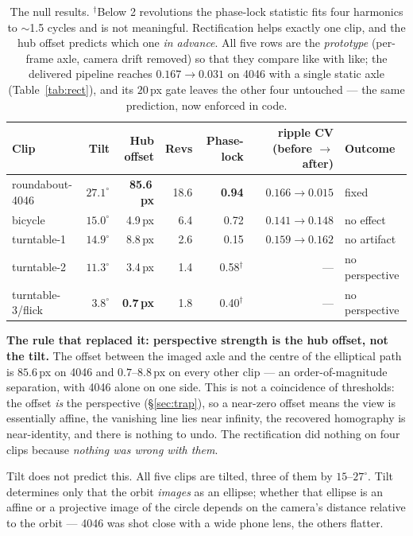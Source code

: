 \documentclass[11pt,a4paper]{article}
\begin{document}
\begin{table}[htbp]
\centering
\footnotesize
\begin{tabular}{lrrrrrl}
\toprule
Clip & Tilt & \textbf{Hub offset} & Revs & Phase-lock & ripple CV (before $\to$ after) & Outcome \\
\midrule
roundabout-4046   & $27.1^\circ$ & \textbf{85.6\,px} & 18.6 & \textbf{0.94} & $0.166 \to \mathbf{0.015}$ & fixed \\
bicycle           & $15.0^\circ$ & 4.9\,px  & 6.4 & 0.72 & $0.141 \to 0.148$ & no effect \\
turntable-1       & $14.9^\circ$ & 8.8\,px  & 2.6 & 0.15 & $0.159 \to 0.162$ & no artifact \\
turntable-2       & $11.3^\circ$ & 3.4\,px  & 1.4 & 0.58$^\dag$ & --- & no perspective \\
turntable-3/flick & $3.8^\circ$  & \textbf{0.7\,px} & 1.8 & 0.40$^\dag$ & --- & no perspective \\
\bottomrule
\end{tabular}
\caption{The null results. $^\dag$Below 2 revolutions the phase-lock statistic fits four
harmonics to $\sim$1.5 cycles and is not meaningful. Rectification helps exactly one clip, and
the hub offset predicts which one \emph{in advance}. All five rows are the \emph{prototype}
(per-frame axle, camera drift removed) so that they compare like with like; the delivered pipeline
reaches $0.167 \to 0.031$ on 4046 with a single static axle (Table~\ref{tab:rect}), and its
$20$\,px gate leaves the other four untouched --- the same prediction, now enforced in code.}
\label{tab:null}
\end{table}

\textbf{The rule that replaced it: perspective strength is the hub offset, not the tilt.} The
offset between the imaged axle and the centre of the elliptical path is $85.6$\,px on 4046 and
$0.7$--$8.8$\,px on every other clip --- an order-of-magnitude separation, with 4046 alone on
one side. This is not a coincidence of thresholds: the offset \emph{is} the perspective
(\S\ref{sec:trap}), so a near-zero offset means the view is essentially affine, the vanishing
line lies near infinity, the recovered homography is near-identity, and there is nothing to
undo. The rectification did nothing on four clips because \emph{nothing was wrong with them}.

Tilt does not predict this. All five clips are tilted, three of them by $15$--$27^\circ$. Tilt
determines only that the orbit \emph{images} as an ellipse; whether that ellipse is an affine or
a projective image of the circle depends on the camera's distance relative to the orbit --- 4046
was shot close with a wide phone lens, the others flatter.
\end{document}

